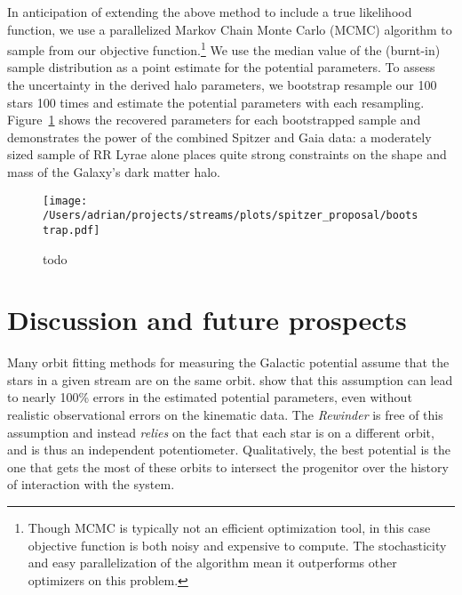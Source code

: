 \documentclass[preprint]{aastex}
\begin{document}
In anticipation of extending the above method to include a true
likelihood function, we use a parallelized Markov Chain Monte Carlo
(MCMC) algorithm \citep{foremanmackey2013} to sample from our
objective function.\footnote{Though MCMC is typically not an efficient
  optimization tool, in this case objective function is both noisy and
  expensive to compute. The stochasticity and easy parallelization of
  the algorithm mean it outperforms other optimizers on this problem.}
We use the median value of the (burnt-in) sample distribution as a
point estimate for the potential parameters. To assess the uncertainty
in the derived halo parameters, we bootstrap resample our 100 stars
100 times and estimate the potential parameters with each
resampling. Figure~\ref{fig:bootstrap} shows the recovered parameters
for each bootstrapped sample and demonstrates the power of the
combined Spitzer and Gaia data: a moderately sized sample of RR Lyrae
alone places quite strong constraints on the shape and mass of the
Galaxy's dark matter halo.

\begin{figure}[h]
\begin{center}
\texttt{[image: /Users/adrian/projects/streams/plots/spitzer\_proposal/bootstrap.pdf]}
\caption{ todo }\label{fig:bootstrap}
\end{center}
\end{figure}


\section{Discussion and future prospects}
\label{sec:discussion}

Many orbit fitting methods for measuring the Galactic potential assume
that the stars in a given stream are on the same
orbit. \cite{sanders13a} show that this assumption can lead to nearly
100\% errors in the estimated potential parameters, even without
realistic observational errors on the kinematic data. The
\emph{Rewinder} is free of this assumption and instead \emph{relies}
on the fact that each star is on a different orbit, and is thus an
independent potentiometer. Qualitatively, the best potential is the
one that gets the most of these orbits to intersect the progenitor
over the history of interaction with the system.
\end{document}
